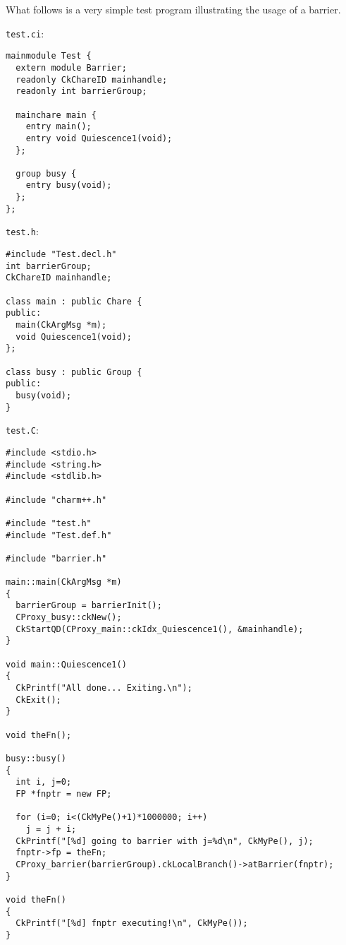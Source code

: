 What follows is a very simple test program illustrating the usage of a
barrier.

{\tt test.ci}:

\begin{verbatim}
mainmodule Test {
  extern module Barrier;
  readonly CkChareID mainhandle;
  readonly int barrierGroup;
  
  mainchare main {
    entry main();
    entry void Quiescence1(void);
  };
  
  group busy {
    entry busy(void);
  };
};
\end{verbatim}

{\tt test.h}:

\begin{verbatim}
#include "Test.decl.h"
int barrierGroup;
CkChareID mainhandle;

class main : public Chare {
public:
  main(CkArgMsg *m);
  void Quiescence1(void);
};

class busy : public Group {
public:
  busy(void);
}
\end{verbatim}

{\tt test.C}:

\begin{verbatim}
#include <stdio.h>
#include <string.h>
#include <stdlib.h>

#include "charm++.h"

#include "test.h"
#include "Test.def.h"

#include "barrier.h"

main::main(CkArgMsg *m)
{
  barrierGroup = barrierInit();
  CProxy_busy::ckNew();
  CkStartQD(CProxy_main::ckIdx_Quiescence1(), &mainhandle);
}

void main::Quiescence1() 
{ 
  CkPrintf("All done... Exiting.\n");
  CkExit();
}

void theFn();

busy::busy()
{
  int i, j=0;
  FP *fnptr = new FP;

  for (i=0; i<(CkMyPe()+1)*1000000; i++)
    j = j + i;
  CkPrintf("[%d] going to barrier with j=%d\n", CkMyPe(), j);
  fnptr->fp = theFn;
  CProxy_barrier(barrierGroup).ckLocalBranch()->atBarrier(fnptr);
}

void theFn()
{
  CkPrintf("[%d] fnptr executing!\n", CkMyPe());
}
\end{verbatim}

